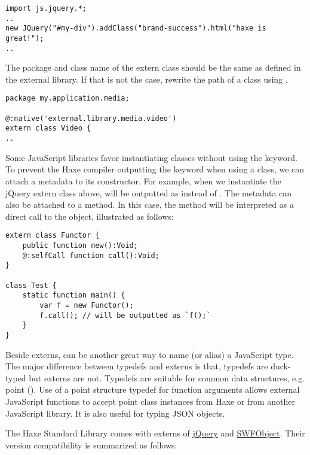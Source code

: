 \begin{lstlisting}
import js.jquery.*;
..
new JQuery("#my-div").addClass("brand-success").html("haxe is great!");
..
\end{lstlisting}

The package and class name of the extern class should be the same as defined in the external library. If that is not the case, rewrite the path of a class using .

\begin{lstlisting}
package my.application.media;

@:native('external.library.media.video')
extern class Video {
..
\end{lstlisting}

Some JavaScript libraries favor instantiating classes without using the  keyword. To prevent the Haxe compiler outputting the  keyword when using a class, we can attach a  metadata to its constructor. For example, when we instantiate the jQuery extern class above,  will be outputted as \expr{\$()} instead of . The  metadata can also be attached to a method. In this case, the method will be interpreted as a direct call to the object, illustrated as follows:

\begin{lstlisting}
extern class Functor {
	public function new():Void;
	@:selfCall function call():Void;
}

class Test {
	static function main() {
		var f = new Functor();
		f.call(); // will be outputted as `f();`
	}
}
\end{lstlisting}

Beside externs,  can be another great way to name (or alias) a JavaScript type. The major difference between typedefs and externs is that, typedefs are duck-typed but externs are not. Typedefs are suitable for common data structures, e.g. point (). Use of a point structure typedef for function arguments allows external JavaScript functions to accept point class instances from Haxe or from another JavaScript library. It is also useful for typing JSON objects.

The Haxe Standard Library comes with externs of \href{https://jquery.com/}{jQuery} and \href{http://blog.deconcept.com/swfobject/}{SWFObject}. Their version compatibility is summarized as follows:


